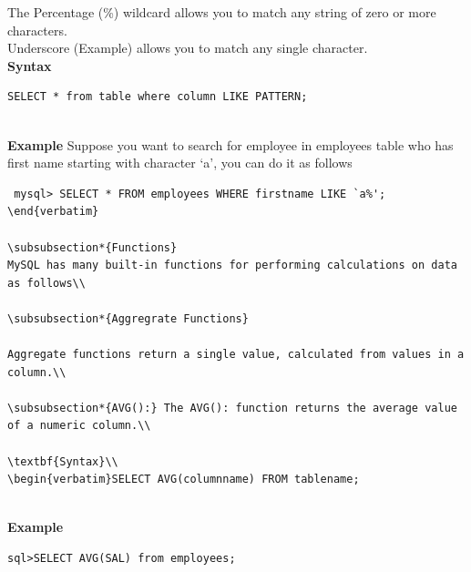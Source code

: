 \documentclass[11pt,a4paper]{article}
\begin{document}
The Percentage (\%) wildcard allows you to match any string of zero or more characters.\\
Underscore ({Example}) allows you to match any single character.\\

\textbf{Syntax}\\
\begin{verbatim}SELECT * from table where column LIKE PATTERN; \end{verbatim}\\

\textbf{Example}
Suppose you want to search for employee in employees table who has first name starting with character `a', you can do it as follows\\

\begin{verbatim} mysql> SELECT * FROM employees WHERE firstname LIKE `a%'; \end{verbatim}

\subsubsection*{Functions}
MySQL has many built-in functions for performing calculations on data as follows\\

\subsubsection*{Aggregrate Functions}

Aggregate functions return a single value, calculated from values in a column.\\

\subsubsection*{AVG():} The AVG(): function returns the average value of a numeric column.\\

\textbf{Syntax}\\
\begin{verbatim}SELECT AVG(columnname) FROM tablename; \end{verbatim}\\

\textbf{Example}
\begin{verbatim}sql>SELECT AVG(SAL) from employees; \end{verbatim}\\
\end{document}
